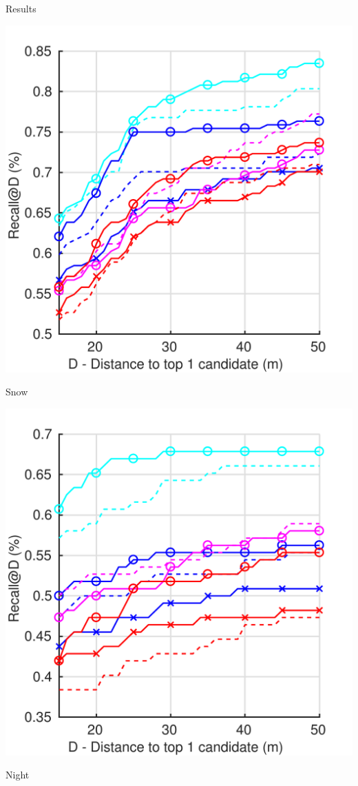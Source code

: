 \documentclass[final]{beamer}
\newlength{\colwidth}
\begin{document}
\begin{frame}[t]
\begin{columns}[t]
\begin{column}{\colwidth}
\begin{block}{Results}
\begin{minipage}{0.49\linewidth}
			\includegraphics[width=\linewidth]{vect/res/lt}
		\end{minipage}
		
		\begin{minipage}{0.49\linewidth}
	  		\centering
			Snow
			
			\includegraphics[width=\linewidth]{vect/res/snow}
		\end{minipage}\hfill
		\begin{minipage}{0.49\linewidth}
	  		\centering
	  		Night
	  					

\end{minipage}
\end{block}
\end{column}
\end{columns}
\end{frame}
\end{document}
